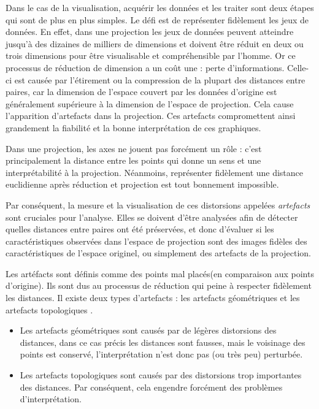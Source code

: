 Dans le cas de la visualisation, acquérir les données et les traiter sont deux étapes qui sont de plus en plus simples. Le défi est de représenter fidèlement les jeux de données. En effet, dans une projection les jeux de données peuvent atteindre jusqu’à des dizaines de milliers de dimensions et doivent être réduit en deux ou trois dimensions pour être visualisable et compréhensible par l’homme. 
Or ce processus de réduction de dimension a un coût une : perte d’informations.
Celle-ci est causée par l'étirement ou la compression de la plupart des distances entre paires, car la dimension de l'espace couvert par les données d'origine est généralement supérieure à la dimension de l'espace de projection. Cela cause l’apparition d’artefacts dans la projection. 
Ces artefacts compromettent ainsi grandement la fiabilité et la bonne interprétation de ces graphiques\cite{scarlet}. 

Dans une projection, les axes ne jouent pas forcément un rôle : c’est principalement la distance entre les points qui donne un sens et une interprétabilité à la projection\cite{koffka1997PsychoGesttalt}. 
Néanmoins, représenter fidèlement une distance euclidienne après réduction et projection est tout bonnement impossible. 

Par conséquent, la mesure et la visualisation de ces distorsions appelées \textit{artefacts} sont cruciales pour l'analyse. Elles se doivent d'être analysées afin de détecter quelles distances entre paires ont été préservées, 
et donc d'évaluer si les caractéristiques observées dans l'espace de projection sont des images fidèles des caractéristiques de l'espace originel, ou simplement des artefacts de la projection.
\medskip

Les artéfacts sont définis comme des points mal placés(en comparaison aux points d’origine). Ils sont dus au processus de réduction qui peine à respecter fidèlement les distances. Il existe deux types d’artefacts : les artefacts géométriques et les artefacts topologiques \cite{HeulotAnEvaluation}.
\begin{itemize}
    \item Les artefacts géométriques sont causés par de légères distorsions des distances, dans ce cas précis les distances sont fausses, mais le voisinage des points est conservé,  l’interprétation n’est donc pas (ou très peu) perturbée.
    \item Les artefacts topologiques sont causés par des distorsions trop importantes des distances. Par conséquent, cela engendre forcément des problèmes d’interprétation.
\end{itemize}

